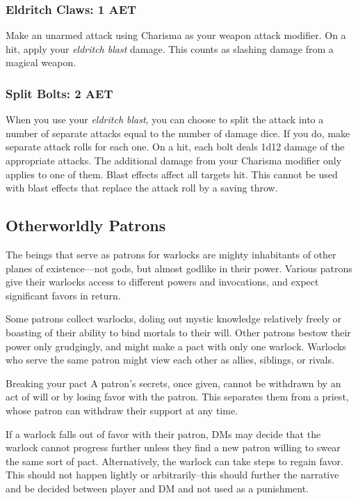 \subsubsection{Eldritch Claws: 1 AET}
Make an unarmed attack using Charisma as your weapon attack modifier. On a hit, apply your \textit{eldritch blast} damage. This counts as slashing damage from a magical weapon.

\subsubsection{Split Bolts: 2 AET}
When you use your \textit{eldritch blast}, you can choose to split the attack into a number of separate attacks equal to the number of damage dice. If you do, make separate attack rolls for each one. On a hit, each bolt deals 1d12 damage of the appropriate attacks. The additional damage from your Charisma modifier only applies to one of them. Blast effects affect all targets hit. This cannot be used with blast effects that replace the attack roll by a saving throw.

\subsection{Otherworldly Patrons}

The beings that serve as patrons for warlocks are mighty inhabitants of other planes of existence—not gods, but almost godlike in their power. Various patrons give their warlocks access to different powers and invocations, and expect significant favors in return.

Some patrons collect warlocks, doling out mystic knowledge relatively freely or boasting of their ability to bind mortals to their will. Other patrons bestow their power only grudgingly, and might make a pact with only one warlock. Warlocks who serve the same patron might view each other as allies, siblings, or rivals.

\begin{DndComment}{Breaking your pact}
	A patron's secrets, once given, cannot be withdrawn by an act of will or by losing favor with the patron. This separates them from a priest, whose patron can withdraw their support at any time.

	If a warlock falls out of favor with their patron, DMs may decide that the warlock cannot progress further unless they find a new patron willing to swear the same sort of pact. Alternatively, the warlock can take steps to regain favor. This should not happen lightly or arbitrarily--this should further the narrative and be decided between player and DM and not used as a punishment.
\end{DndComment}

